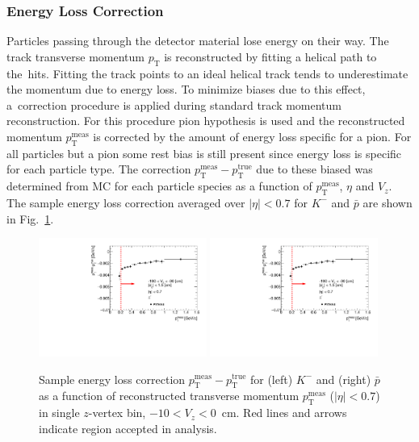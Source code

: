 \subsubsection{Energy Loss Correction}\label{section:star_energyLoss}
Particles passing through the detector material lose energy on their way. The track transverse momentum $p_\textrm{T}$ is reconstructed by fitting a helical path to the~hits. Fitting the track points to an ideal
helical track tends to underestimate the momentum due to energy loss. To minimize biases due to this effect, a~correction procedure is applied 
during standard track momentum reconstruction. For this procedure pion hypothesis is used  and the reconstructed momentum $p_\textrm{T}^\textrm{meas}$ is corrected by the amount of energy loss specific for a pion.  For all particles but a pion some rest bias  is still present since  energy loss is specific for each particle type. 
The correction $p_\textrm{T}^\textrm{meas}-p_\textrm{T}^\textrm{true}$ due to these biased was determined from MC for each particle species as a function of $p_\textrm{T}^\textrm{meas}$, $\eta$ and $V_z$. 
The sample energy loss correction averaged over $|\eta|<0.7$ for $K^-$ and $\bar{p}$ are shown in Fig.~\ref{fig:energyLoss}. 

\begin{figure}[h!]
	\centering
	\includegraphics[width=0.49\textwidth,page=30]{chapters/chrgSTAR/img/energyLoss/energyLoss3D_OnePrtAlso.pdf}
	\includegraphics[width=0.49\textwidth,page=50]{chapters/chrgSTAR/img/energyLoss/energyLoss3D_OnePrtAlso.pdf}
		\caption{Sample energy loss correction $p_\textrm{T}^\textrm{meas} - p_\textrm{T}^\textrm{true}$ for (left) $K^-$ and (right) $\bar{p}$ as a function of reconstructed transverse 
			momentum $p_\textrm{T}^\textrm{meas}$ ($|\eta| < 0.7$) in single $z$-vertex bin, $-10 < V_z < 0$~cm. Red lines and arrows indicate region 
			accepted in analysis.}
		\label{fig:energyLoss}
	
\end{figure}



